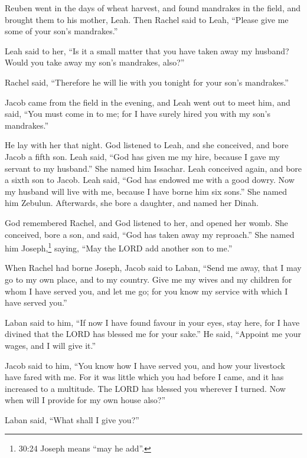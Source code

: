  Reuben went in the days of wheat harvest, and found
mandrakes in the field, and brought them to his mother, Leah. Then
Rachel said to Leah, ``Please give me some of your son's mandrakes.''

 Leah said to her, ``Is it a small matter that you have
taken away my husband? Would you take away my son's mandrakes, also?''

Rachel said, ``Therefore he will lie with you tonight for your son's
mandrakes.''

 Jacob came from the field in the evening, and Leah went
out to meet him, and said, ``You must come in to me; for I have surely
hired you with my son's mandrakes.''

He lay with her that night.  God listened to Leah, and she
conceived, and bore Jacob a fifth son.  Leah said, ``God
has given me my hire, because I gave my servant to my husband.'' She
named him Issachar.  Leah conceived again, and bore a sixth
son to Jacob.  Leah said, ``God has endowed me with a good
dowry. Now my husband will live with me, because I have borne him six
sons.'' She named him Zebulun.  Afterwards, she bore a
daughter, and named her Dinah.

 God remembered Rachel, and God listened to her, and opened
her womb.  She conceived, bore a son, and said, ``God has
taken away my reproach.''  She named him Joseph,\footnote{30:24
  Joseph means ``may he add''.} saying, ``May the LORD add another son
to me.''

 When Rachel had borne Joseph, Jacob said to Laban, ``Send
me away, that I may go to my own place, and to my country. 
Give me my wives and my children for whom I have served you, and let me
go; for you know my service with which I have served you.''

 Laban said to him, ``If now I have found favour in your
eyes, stay here, for I have divined that the LORD has blessed me for
your sake.''  He said, ``Appoint me your wages, and I will
give it.''

 Jacob said to him, ``You know how I have served you, and
how your livestock have fared with me.  For it was little
which you had before I came, and it has increased to a multitude. The
LORD has blessed you wherever I turned. Now when will I provide for my
own house also?''

 Laban said, ``What shall I give you?''

